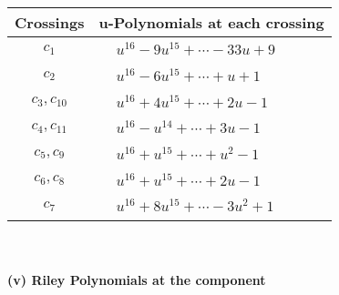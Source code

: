 \documentclass[1p]{elsarticle_modified}
\theoremstyle{definition}
\begin{document}
\begin{tabular}{m{50pt}|m{274pt}}
Crossings & \hspace{64pt}u-Polynomials at each crossing \\
\hline $$\begin{aligned}c_{1}\end{aligned}$$&$\begin{aligned}
&u^{16}-9 u^{15}+\cdots-33 u+9
\end{aligned}$\\
\hline $$\begin{aligned}c_{2}\end{aligned}$$&$\begin{aligned}
&u^{16}-6 u^{15}+\cdots+u+1
\end{aligned}$\\
\hline $$\begin{aligned}c_{3},c_{10}\end{aligned}$$&$\begin{aligned}
&u^{16}+4 u^{15}+\cdots+2 u-1
\end{aligned}$\\
\hline $$\begin{aligned}c_{4},c_{11}\end{aligned}$$&$\begin{aligned}
&u^{16}- u^{14}+\cdots+3 u-1
\end{aligned}$\\
\hline $$\begin{aligned}c_{5},c_{9}\end{aligned}$$&$\begin{aligned}
&u^{16}+u^{15}+\cdots+u^2-1
\end{aligned}$\\
\hline $$\begin{aligned}c_{6},c_{8}\end{aligned}$$&$\begin{aligned}
&u^{16}+u^{15}+\cdots+2 u-1
\end{aligned}$\\
\hline $$\begin{aligned}c_{7}\end{aligned}$$&$\begin{aligned}
&u^{16}+8 u^{15}+\cdots-3 u^2+1
\end{aligned}$\\
\hline
\end{tabular}\\~\\
\newpage\renewcommand{\arraystretch}{1}
\flushleft \textbf{(v) Riley Polynomials at the component}\newline \\
\end{document}
